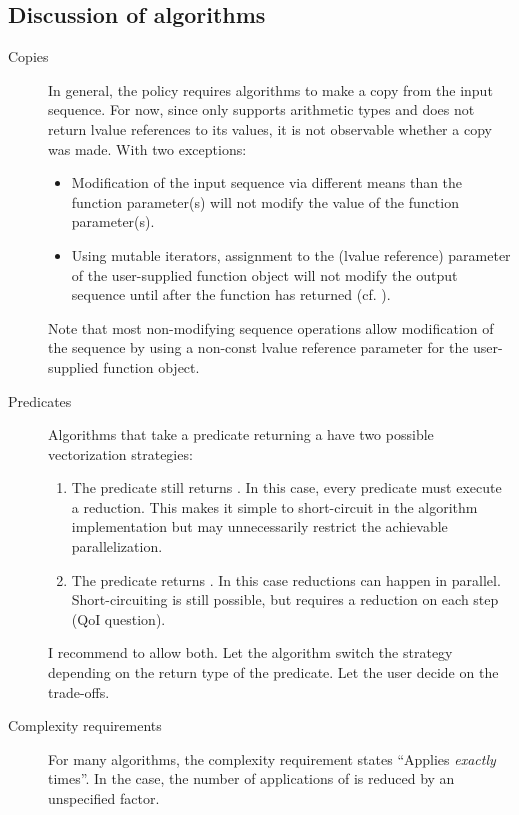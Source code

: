 \subsection{Discussion of algorithms}
\begin{description}
  \item[Copies]
    In general, the \simdEP policy requires algorithms to make a copy from the input sequence.
    For now, since \simd only supports arithmetic types and \simd does not return lvalue references to its values, it is not observable whether a copy was made.
    With two exceptions:
    \begin{itemize}
      \item Modification of the input sequence via different means than the function parameter(s) will not modify the value of the function parameter(s).
      \item Using mutable iterators, assignment to the \simd (lvalue reference) parameter of the user-supplied function object will not modify the output sequence until after the function has returned (cf. ).
    \end{itemize}
    Note that most non-modifying sequence operations allow modification of the sequence by using a non-const lvalue reference parameter for the user-supplied function object.

  \item[Predicates] Algorithms that take a predicate returning a \bool have two possible vectorization strategies:
    \begin{enumerate}
      \item The predicate still returns \bool.
        In this case, every predicate must execute a  reduction.
        This makes it simple to short-circuit in the algorithm implementation but may unnecessarily restrict the achievable parallelization.
      \item The predicate returns .
        In this case  reductions can happen in parallel.
        Short-circuiting is still possible, but requires a  reduction on each step (QoI question).
    \end{enumerate}
    I recommend to allow both.
    Let the algorithm switch the strategy depending on the return type of the predicate.
    Let the user decide on the trade-offs.

  \item[Complexity requirements]
    For many algorithms, the complexity requirement states “Applies  \emph{exactly}  times”.
    In the \simdEP case, the number of applications of  is reduced by an unspecified factor.


\end{description}
